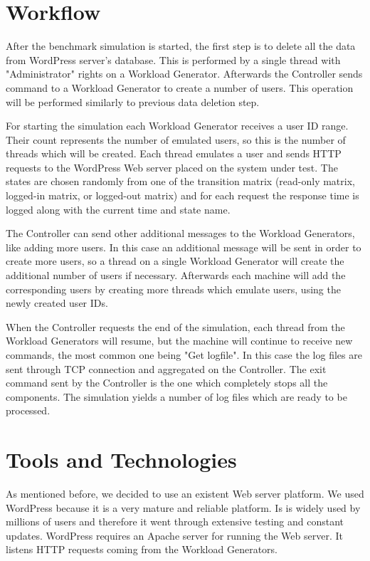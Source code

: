 \section{Workflow}
\label{sec:workflow}

After the benchmark simulation is started, the first step is to delete all the data from WordPress server's database. This is performed by a single thread with "Administrator" rights on a Workload Generator. Afterwards the Controller sends command to a Workload Generator to create a number of users. This operation will be performed similarly to previous data deletion step. 

For starting the simulation each Workload Generator receives a user ID range. Their count represents the number of emulated users, so this is the number of threads which will be created. Each thread emulates a user and sends HTTP requests to the WordPress Web server placed on the system under test. The states are chosen randomly from one of the transition matrix (read-only matrix, logged-in matrix, or logged-out matrix) and for each request the response time is logged along with the current time and state name. 

The Controller can send other additional messages to the Workload Generators, like adding more users. In this case an additional message will be sent in order to create more users, so a thread on a single Workload Generator will create the additional number of users if necessary. Afterwards each machine will add the corresponding users by creating more threads which emulate users, using the newly created user IDs. 

When the Controller requests the end of the simulation, each thread from the Workload Generators will resume, but the machine will continue to receive new commands, the most common one being "Get logfile". In this case the log files are sent through TCP connection and aggregated on the Controller. The exit command sent by the Controller is the one which completely stops all the components. The simulation yields a number of log files which are ready to be processed.

\section{Tools and Technologies}
\label{sec:tools-and-technologies}

As mentioned before, we decided to use an existent Web server platform. We used WordPress because it is a very mature and reliable platform. Is is widely used by millions of users and therefore it went through extensive testing and constant updates. WordPress requires an Apache server for running the Web server. It listens HTTP requests coming from the Workload Generators. 

